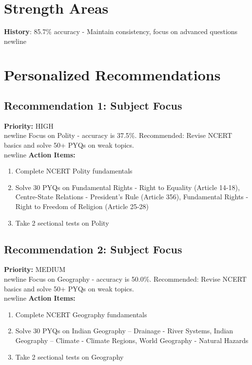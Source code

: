 \documentclass[a4paper,12pt]{article}
\begin{document}
\section{Strength Areas}
\textbf{History}: 85.7\% accuracy - Maintain consistency, focus on advanced questions\\newline
\section{Personalized Recommendations}
\subsection{Recommendation 1: Subject Focus}
\textbf{Priority:} \textcolor{brandgold}{HIGH}\\newline
Focus on Polity - accuracy is 37.5\%. Recommended: Revise NCERT basics and solve 50+ PYQs on weak topics.\\newline
\textbf{Action Items:}\newline
\begin{enumerate}
\item Complete NCERT Polity fundamentals
\item Solve 30 PYQs on Fundamental Rights - Right to Equality (Article 14-18), Centre-State Relations - President's Rule (Article 356), Fundamental Rights - Right to Freedom of Religion (Article 25-28)
\item Take 2 sectional tests on Polity
\end{enumerate}
\subsection{Recommendation 2: Subject Focus}
\textbf{Priority:} \textcolor{brandgold}{MEDIUM}\\newline
Focus on Geography - accuracy is 50.0\%. Recommended: Revise NCERT basics and solve 50+ PYQs on weak topics.\\newline
\textbf{Action Items:}\newline
\begin{enumerate}
\item Complete NCERT Geography fundamentals
\item Solve 30 PYQs on Indian Geography – Drainage - River Systems, Indian Geography – Climate - Climate Regions, World Geography - Natural Hazards
\item Take 2 sectional tests on Geography
\end{enumerate}
\end{document}
